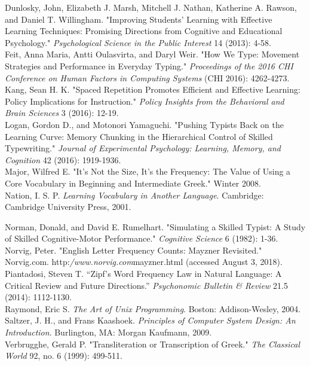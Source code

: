 \documentclass[11pt]{article}
\begin{document}
\begin{hangparas}{.25in}{1}
Dunlosky, John, Elizabeth J. Marsh, Mitchell J. Nathan, Katherine A. Rawson, and Daniel T. Willingham. "Improving Students' Learning with Effective Learning Techniques: Promising Directions from Cognitive and Educational Psychology." \textit{Psychological Science in the Public Interest} 14 (2013): 4-58. \\

Feit, Anna Maria, Antti Oulasvirta, and Daryl Weir. "How We Type: Movement Strategies and Performance in Everyday Typing." \textit{Proceedings of the 2016 CHI Conference on Human Factors in Computing Systems} (CHI 2016): 4262-4273. \\

Kang, Sean H. K. "Spaced Repetition Promotes Efficient and Effective Learning: Policy Implications for Instruction." \textit{Policy Insights from the Behavioral and Brain Sciences} 3 (2016): 12-19. \\

Logan, Gordon D., and Motonori Yamaguchi. "Pushing Typists Back on the Learning Curve: Memory Chunking in the Hierarchical Control of Skilled Typewriting." \textit{Journal of Experimental Psychology: Learning, Memory, and Cognition} 42 (2016): 1919-1936. \\

Major, Wilfred E. "It’s Not the Size, It’s the Frequency: The Value of Using a Core Vocabulary in Beginning and Intermediate Greek." Winter 2008. \\

Nation, I. S. P. \textit{Learning Vocabulary in Another Language}. Cambridge: Cambridge University Press, 2001.

Norman, Donald, and David E. Rumelhart. "Simulating a Skilled Typist: A Study of Skilled Cognitive-Motor Performance." \textit{Cognitive Science} 6 (1982): 1-36. \\

Norvig, Peter. "English Letter Frequency Counts: Mayzner Revisited." Norvig.com. http:\textit{/www.norvig.com}mayzner.html (accessed August 3, 2018). \\

Piantadosi, Steven T. “Zipf’s Word Frequency Law in Natural Language: A Critical Review and Future Directions.” \textit{Psychonomic Bulletin & Review} 21.5 (2014): 1112-1130. \\

Raymond, Eric S. \textit{The Art of Unix Programming}. Boston: Addison-Wesley, 2004. \\

Saltzer, J. H., and Frans Kaashoek. \textit{Principles of Computer System Design: An Introduction}. Burlington, MA: Morgan Kaufmann, 2009. \\

Verbrugghe, Gerald P. "Transliteration or Transcription of Greek." \textit{The Classical World} 92, no. 6 (1999): 499-511. \\

\end{hangparas}
\end{document}
